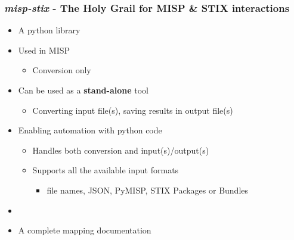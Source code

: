 \begin{frame}
    \frametitle{\emph{misp-stix} - The Holy Grail for MISP \& STIX interactions}
    \begin{minipage}{0.7\textwidth}
        \begin{itemize}
            \item A python library \footnotemark[1]
            \item Used in MISP
            \begin{itemize}
                \item Conversion only
            \end{itemize}
            \item Can be used as a \textbf{stand-alone} tool \footnotemark[2]
            \begin{itemize}
                \item Converting input file(s), saving results in output file(s)
            \end{itemize}
            \item Enabling automation with python code
            \begin{itemize}
                \item Handles both conversion and input(s)/output(s)
                \item Supports all the available input formats
                \begin{itemize}
                    \item file names, JSON, PyMISP, STIX Packages or Bundles
                \end{itemize}
            \end{itemize}
        \item []
        \item A complete mapping documentation\footnotemark[3]
        \end{itemize}
    \end{minipage}%
    \begin{minipage}{0.3\textwidth}
        \centering

\end{minipage}
\end{frame}
